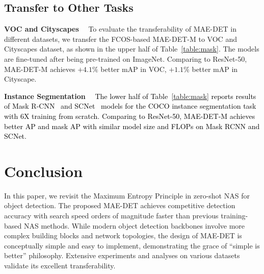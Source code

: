 \documentclass[nohyperref]{article}
\theoremstyle{plain}
\theoremstyle{definition}
\theoremstyle{remark}
\begin{document}
\subsection{Transfer to Other Tasks}
\label{sub:transfer}



\noindent\textbf{VOC and Cityscapes}$\quad$ 
To evaluate the transferability of MAE-DET in different datasets, we transfer the FCOS-based MAE-DET-M to VOC and Cityscapes dataset, as shown in the upper half of Table~\ref{table:mask}. The models are fine-tuned after being pre-trained on ImageNet. Comparing to ResNet-50, MAE-DET-M achieves $+4.1\%$ better mAP in VOC, $+1.1\%$ better mAP in Cityscape.

\noindent\textbf{Instance Segmentation}$\quad$ 
\textcolor{black}{The lower half of Table~\ref{table:mask} reports results of Mask R-CNN~\citep{maskrcnn} and SCNet~\citep{scnet} models for the COCO instance segmentation task with 6X training from scratch. Comparing to ResNet-50, MAE-DET-M achieves better AP and mask AP with similar model size and FLOPs on Mask RCNN and SCNet.}


\section{Conclusion}
In this paper, we revisit the Maximum Entropy Principle in zero-shot NAS for object detection. The proposed MAE-DET achieves competitive detection accuracy with search speed orders of magnitude faster than previous training-based NAS methods. While modern object detection backbones involve more complex building blocks and network topologies, the design of MAE-DET is conceptually simple and easy to implement, demonstrating the grace of ``simple is better'' philosophy. Extensive experiments and analyses on various datasets validate its excellent transferability. 












\newpage
\appendix
\onecolumn
\end{document}
